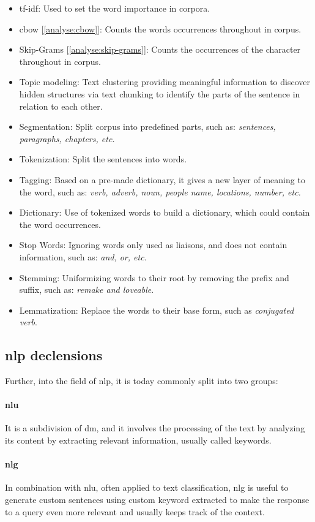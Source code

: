 \begin{itemize}
    \setlength\itemsep{0em}
    \item \gls{tf-idf}: Used to set the word importance in corpora.
    \item \gls{cbow} [\ref{analyse:cbow}]: Counts the words occurrences throughout in corpus.
    \item Skip-Grams [\ref{analyse:skip-grams}]: Counts the occurrences of the character throughout in corpus.
    \item Topic modeling: Text clustering providing meaningful information to discover hidden structures via text chunking to identify the parts of the sentence in relation to each other.
    \item Segmentation: Split corpus into predefined parts, such as: \textit{sentences, paragraphs, chapters, etc.}
    \item Tokenization: Split the sentences into words.
    \item Tagging: Based on a pre-made dictionary, it gives a new layer of meaning to the word, such as: \textit{verb, adverb, noun, people name, locations, number, etc.}
    \item Dictionary: Use of tokenized words to build a dictionary, which could contain the word occurrences.
    \item Stop Words: Ignoring words only used as liaisons, and does not contain information, such as: \textit{and, or, etc.}
    \item Stemming: Uniformizing words to their root by removing the prefix and suffix, such as: \textit{remake and loveable}.
    \item Lemmatization: Replace the words to their base form, such as \textit{conjugated verb}.
\end{itemize}

\subsection{\gls{nlp} declensions}
Further, into the field of \gls{nlp}, it is today commonly split into two groups:

\paragraph{\gls{nlu}}
It is a subdivision of \gls{dm}, and it involves the processing of the text by analyzing its content by extracting relevant information, usually called keywords.

\paragraph{\gls{nlg}}
In combination with \gls{nlu}, often applied to text classification, \gls{nlg} is useful to generate custom sentences using custom keyword extracted to make the response to a query even more relevant and usually keeps track of the context.


